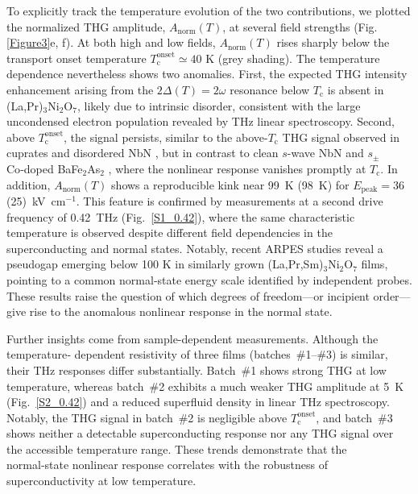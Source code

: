 \documentclass{nature}
\begin{document}
To explicitly track the temperature evolution of the two contributions, we plotted the normalized THG amplitude, $A_{\text{norm}}(T)$, at several field strengths (Fig. \ref{Figure3}e, f). At both high and low fields, $A_{\mathrm{norm}}(T)$ rises sharply below the transport onset temperature $T_\mathrm{c}^{\mathrm{onset}}\simeq 40$ K (grey shading). The temperature dependence nevertheless shows two anomalies. First, the expected THG intensity enhancement arising from the $2\Delta(T) = 2\omega$ resonance below $T_\text{c}$ \cite{Matsunaga2014,Wang2022,Kovalev2021,Yuan2024} is absent in (La,Pr)$_3$Ni$_2$O$_7$, likely due to intrinsic disorder, consistent with the large uncondensed electron population revealed by THz linear spectroscopy. Second, above $T_\text{c}^{\text{onset}}$, the signal persists, similar to the above-$T_\text{c}$ THG signal observed in cuprates and disordered NbN \cite{Katsumi2018,Chu2020,Yuan2024,wang2025anomal}, but in contrast to clean $s$-wave NbN \cite{Matsunaga2013,Matsunaga2014,Wang2022} and $s_\pm$ Co‑doped BaFe$_2$As$_2$ \cite{JGWang_iron_based_Higgs}, where the nonlinear response vanishes promptly at $T_\mathrm{c}$. In addition, $A_{\text{norm}}(T)$ shows a reproducible kink near 99 K (98 K) for $E_{\text{peak}}=36$ (25) kV cm$^{-1}$. This feature is confirmed by measurements at a second drive frequency of 0.42 THz (Fig. \ref{S1_0.42}), where the same characteristic temperature is observed despite different field dependencies in the superconducting and normal states. Notably, recent ARPES studies reveal a pseudogap emerging below 100 K \cite{shen2025LPSNO} in similarly grown (La,Pr,Sm)$_3$Ni$_2$O$_7$ films, pointing to a common normal‑state energy scale identified by independent probes. These results raise the question of which degrees of freedom—or incipient order—give rise to the anomalous nonlinear response in the normal state. 


Further insights come from sample-dependent measurements. Although the temperature‑ dependent resistivity of three films (batches \#1–\#3) is similar, their THz responses differ substantially. Batch \#1 shows strong THG at low temperature, whereas batch \#2 exhibits a much weaker THG amplitude at 5 K (Fig. \ref{S2_0.42}) and a reduced superfluid density in linear THz spectroscopy. Notably, the THG signal in batch \#2 is negligible above $T_\mathrm{c}^{\mathrm{onset}}$, and batch \#3 shows neither a detectable superconducting response nor any THG signal over the accessible temperature range. These trends demonstrate that the normal‑state nonlinear response correlates with the robustness of superconductivity at low temperature.
\end{document}
